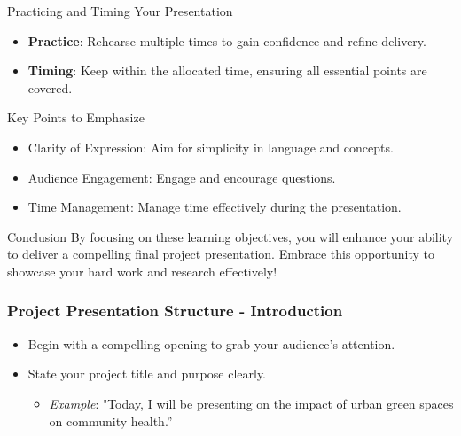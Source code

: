 \documentclass[aspectratio=169]{beamer}
\begin{document}
\begin{frame}[fragile]{Practicing and Timing Your Presentation}
    \begin{itemize}
        \item \textbf{Practice}: Rehearse multiple times to gain confidence and refine delivery.
        \item \textbf{Timing}: Keep within the allocated time, ensuring all essential points are covered.
    \end{itemize}
\end{frame}

\begin{frame}[fragile]{Key Points to Emphasize}
    \begin{itemize}
        \item Clarity of Expression: Aim for simplicity in language and concepts.
        \item Audience Engagement: Engage and encourage questions.
        \item Time Management: Manage time effectively during the presentation.
    \end{itemize}
\end{frame}

\begin{frame}[fragile]{Conclusion}
    By focusing on these learning objectives, you will enhance your ability to deliver a compelling final project presentation. Embrace this opportunity to showcase your hard work and research effectively!
\end{frame}

\begin{frame}[fragile]
    \frametitle{Project Presentation Structure - Introduction}
    \begin{itemize}
        \item Begin with a compelling opening to grab your audience’s attention.
        \item State your project title and purpose clearly. 
        \begin{itemize}
            \item \textit{Example}: "Today, I will be presenting on the impact of urban green spaces on community health.”
        \end{itemize}
    \end{itemize}
\end{frame}
\end{document}
